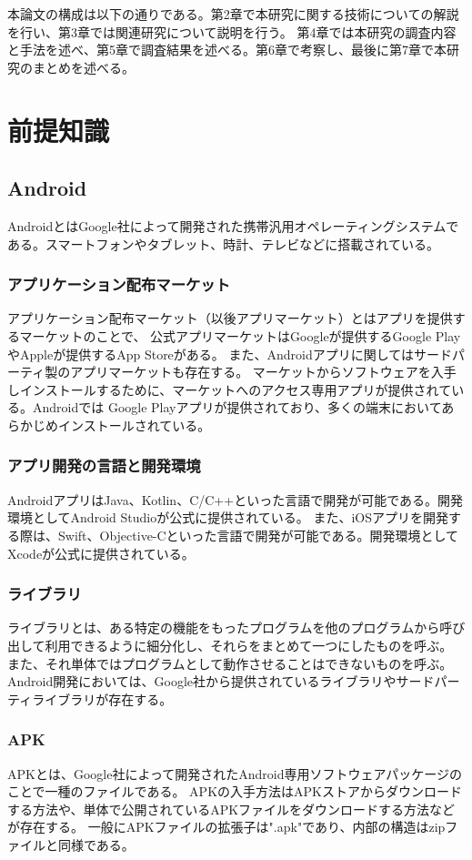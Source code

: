 \documentclass[a4j]{jarticle}
\begin{document}
本論文の構成は以下の通りである。第2章で本研究に関する技術についての解説を行い、第3章では関連研究について説明を行う。
第4章では本研究の調査内容と手法を述べ、第5章で調査結果を述べる。第6章で考察し、最後に第7章で本研究のまとめを述べる。


\newpage
\section{前提知識}
\subsection{Android}
AndroidとはGoogle社によって開発された携帯汎用オペレーティングシステムである。スマートフォンやタブレット、時計、テレビなどに搭載されている。

\subsubsection{アプリケーション配布マーケット}
アプリケーション配布マーケット（以後アプリマーケット）とはアプリを提供するマーケットのことで、
公式アプリマーケットはGoogleが提供するGoogle PlayやAppleが提供するApp Storeがある。
また、Androidアプリに関してはサードパーティ製のアプリマーケットも存在する。
マーケットからソフトウェアを入手しインストールするために、マーケットへのアクセス専用アプリが提供されている。Androidでは
Google Playアプリが提供されており、多くの端末においてあらかじめインストールされている。
\subsubsection{アプリ開発の言語と開発環境}
AndroidアプリはJava、Kotlin、C/C++といった言語で開発が可能である。開発環境としてAndroid Studioが公式に提供されている。
また、iOSアプリを開発する際は、Swift、Objective-Cといった言語で開発が可能である。開発環境としてXcodeが公式に提供されている。
\subsubsection{ライブラリ}
ライブラリとは、ある特定の機能をもったプログラムを他のプログラムから呼び出して利用できるように細分化し、それらをまとめて一つにしたものを呼ぶ。
また、それ単体ではプログラムとして動作させることはできないものを呼ぶ。
Android開発においては、Google社から提供されているライブラリやサードパーティライブラリが存在する。
\subsubsection{APK}
APKとは、Google社によって開発されたAndroid専用ソフトウェアパッケージのことで一種のファイルである。
APKの入手方法はAPKストアからダウンロードする方法や、単体で公開されているAPKファイルをダウンロードする方法などが存在する。
一般にAPKファイルの拡張子は".apk"であり、内部の構造はzipファイルと同様である。
\end{document}
